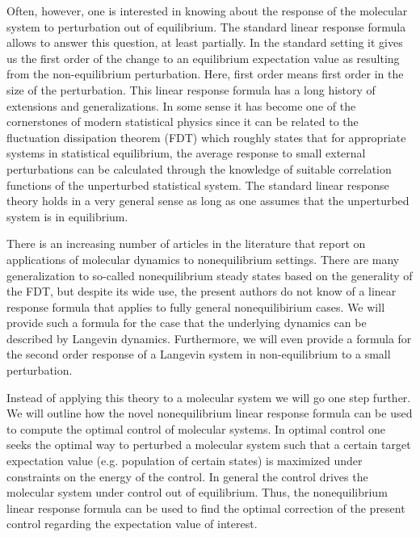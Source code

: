 \documentclass[]{tMPH2e}
\begin{document}
Often, however, one is interested in knowing about the response of the molecular system to perturbation out of equilibrium. The standard linear response formula allows to answer this question, at least partially. In the standard setting it gives us the first order of the change to an equilibrium expectation value as resulting from the non-equilibrium perturbation. Here, first order means first order in the size of the perturbation. This linear response formula has a long history of extensions and generalizations. In some sense it has become one of the cornerstones of modern statistical physics since it can be related to the fluctuation dissipation theorem (FDT) which roughly states that for appropriate systems in statistical equilibrium, the average response to small external perturbations can be calculated through the knowledge of suitable correlation functions of the unperturbed statistical system. The standard linear response theory holds in a  very general sense \cite{hairer2008} as long as one assumes that the unperturbed system is in equilibrium.

There is an increasing number of articles in the literature that report on applications of molecular dynamics to nonequilibrium settings. There are many generalization to so-called nonequilibrium steady states based on the generality of the FDT, but despite its wide use, the present authors do not know of a linear response formula that applies to fully general nonequilibirium cases. We will provide such a formula for the case that the underlying dynamics can be described by Langevin dynamics. Furthermore, we will even provide a formula for the second order response of a Langevin system in non-equilibrium to a small perturbation.

Instead of applying this theory to a molecular system we will go one step further. We will outline how the novel nonequilibrium linear response formula can be used to compute the optimal control of molecular systems. In optimal control one seeks the optimal way to perturbed a molecular system such that a certain target expectation value (e.g. population of certain states) is maximized under constraints on the energy of the control. In general the control drives the molecular system under control out of equilibrium. Thus, the nonequilibrium linear response formula can be used to find the optimal correction of the present control regarding the expectation value of interest. 
\end{document}
